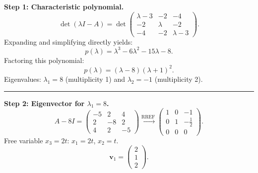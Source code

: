 \documentclass[12pt,a3paper]{article}
\begin{document}
\begin{tcolorbox}[enhanced,breakable,
  colback=cE!4,colframe=cE,boxrule=0.8pt,arc=5pt,
  title={\textbf{Answer --- Eigenvalues \& Eigenvectors of
    $A=\begin{pmatrix}3&2&4\\2&0&2\\4&2&3\end{pmatrix}$}},
  fonttitle=\bfseries\color{white},colbacktitle=cE]

\textbf{Step 1: Characteristic polynomial.}
\[
  \det(\lambda I - A)
  = \det\begin{pmatrix}\lambda-3&-2&-4\\-2&\lambda&-2\\-4&-2&\lambda-3\end{pmatrix}.
\]
Expanding and simplifying directly yields:
\[
  p(\lambda) = \lambda^3 - 6\lambda^2 - 15\lambda - 8.
\]
Factoring this polynomial:
\[
  p(\lambda) = (\lambda - 8)(\lambda + 1)^2.
\]
Eigenvalues: $\boxed{\lambda_1 = 8}$ (multiplicity 1) and $\boxed{\lambda_2 = -1}$ (multiplicity 2).

\medskip\textcolor{cE}{\rule{\textwidth}{0.4pt}}

\textbf{Step 2: Eigenvector for $\lambda_1 = 8$.}
\[
  A - 8I = \begin{pmatrix}-5&2&4\\2&-8&2\\4&2&-5\end{pmatrix}
  \xrightarrow{\text{RREF}}
  \begin{pmatrix}1&0&-1\\0&1&-\frac{1}{2}\\0&0&0\end{pmatrix}.
\]
Free variable $x_3 = 2t$: $x_1 = 2t$, $x_2 = t$.
\[
  \mathbf{v}_1 = \begin{pmatrix}2\\1\\2\end{pmatrix}.
\]


\end{tcolorbox}
\end{document}
